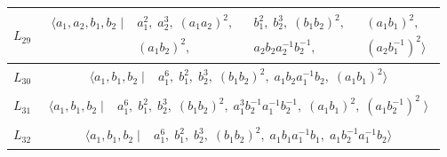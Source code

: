 \documentclass[dvipsnames]{article}
\theoremstyle{definition}
\theoremstyle{remark}
\begin{document}
\begin{longtable}{ |c|c| }
    $L_{29}$
    &
    \begin{minipage}{6cm}
        {
        \vspace{-2.5mm}
        \begin{align*}
            \big \langle
            a_1, a_2, b_1, b_2 \; \big | \;&
            a_1^2, \;
            a_2^3, \;
            (a_1 a_2)^2, && 
            b_1^2, \;
            b_2^3, \;
            (b_1 b_2)^2, &&
            (a_1 b_1)^2, \\
            & (a_1 b_2)^2, &&
            a_2 b_2 a_2^{-1} b_2^{-1}, &&
            (a_2 b_1^{-1})^2
            \big \rangle
        \end{align*}
        \vspace{-5mm}
        }
    \end{minipage}\\
    \hline

    $L_{30}$
    &
    \begin{minipage}{6cm}
        {
        \vspace{-2.5mm}
        \begin{align*}
            \big \langle
            a_1, b_1, b_2 \; \big | \;&
            a_1^6, \;
            b_1^2, \;
            b_2^3, \;
            (b_1 b_2)^2, \;
            a_1 b_2 a_1^{-1} b_2, \;
            (a_1 b_1)^2
            \big \rangle
        \end{align*}
        \vspace{-5mm}
        }
    \end{minipage}\\
    \hline

    $L_{31}$
    &
    \begin{minipage}{6cm}
        {
        \vspace{-2.5mm}
        \begin{align*}
            \big \langle
            a_1, b_1, b_2 \; \big | \;&
            a_1^6, \;
            b_1^2, \;
            b_2^3, \;
            (b_1 b_2)^2, \;
            a_1^3 b_2^{-1} a_1^{-1} b_2^{-1}, \;
            (a_1 b_1)^2, \;
            (a_1 b_2^{-1})^2 \;
            \big \rangle
        \end{align*}
        \vspace{-5mm}
        }
    \end{minipage}\\
    \hline

    $L_{32}$
    &
    \begin{minipage}{6cm}
        {
        \vspace{-2.5mm}
        \begin{align*}
            \big \langle
            a_1, b_1, b_2 \; \big | \;&
            a_1^6, \;
            b_1^2, \;
            b_2^3, \;
            (b_1 b_2)^2, \;
            a_1 b_1 a_1^{-1} b_1, \;
            a_1 b_2^{-1} a_1^{-1} b_2
            \big \rangle
        \end{align*}
        \vspace{-5mm}
        }
    \end{minipage}\\
    \hline


\end{longtable}
\end{document}

